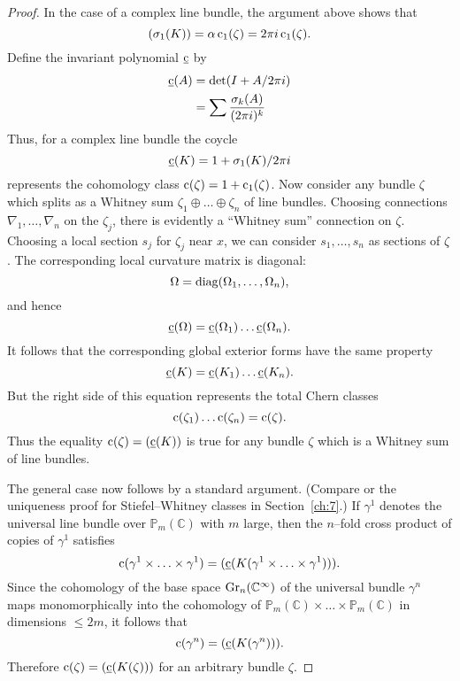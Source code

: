 \documentclass[../main]{subfiles}
\begin{document}
\begin{proof}
In the case of a complex line bundle, the argument above shows that \[(\sigma_1(K)) = \alpha \operatorname{c}_1(\zeta) = 2 \pi i \operatorname{c}_1(\zeta).\] Define the invariant polynomial $\underline {\operatorname{c}}$ by 
\begin{align*}
{\underline {\operatorname{c}}}(A) & = \det(I + A/2\pi i) \\ & = \sum \dfrac{\sigma_k(A)}{(2 \pi i)^k}
\end{align*}
Thus, for a complex line bundle the coycle \[{\underline {\operatorname{c}}}(K) = 1 + \sigma_1(K)/2 \pi i\] represents the cohomology class $\operatorname{c}(\zeta) = 1 + \operatorname{c}_1(\zeta)$. Now consider any bundle $\zeta$ which splits as a Whitney sum $\zeta_1 \oplus \ldots \oplus \zeta_n$ of line bundles. Choosing connections $\nabla_1, \ldots, \nabla_n$ on the $\zeta_j$, there is evidently a ``Whitney sum'' connection on $\zeta$. Choosing a local section $s_j$ for $\zeta_j$ near $x$, we can consider $s_1, \ldots, s_n$ as sections of $\zeta$. The corresponding local curvature matrix is diagonal: \[\Omega = \operatorname{diag}(\Omega_1, \ldots, \Omega_n),\] and hence \[{\underline {\operatorname{c}}}(\Omega) = {\underline {\operatorname{c}}}(\Omega_1) \ldots {\underline {\operatorname{c}}}(\Omega_n).\] It follows that the corresponding global exterior forms have the same property \[{\underline {\operatorname{c}}}(K) = {\underline {\operatorname{c}}}(K_1) \ldots {\underline {\operatorname{c}}}(K_n).\] But the right side of this equation represents the total Chern classes \[\operatorname{c}(\zeta_1) \ldots \operatorname{c}(\zeta_n) = \operatorname{c}(\zeta).\] Thus the equality $\operatorname{c} (\zeta) = ({\underline {\operatorname{c}}}(K))$ is true for any bundle $\zeta$ which is a Whitney sum of line bundles.

The general case now follows by a standard argument. (Compare \cite[Section 4.2]{hirzebruch53} or the uniqueness proof for Stiefel--Whitney classes in Section~\ref{ch:7}.) If $\gamma^1$ denotes the universal line bundle over ${\mathbb P}_m(\mathbb C)$ with $m$ large, then the $n$--fold cross product of copies of $\gamma^1$ satisfies \[\operatorname{c}(\gamma^1 \times \ldots \times \gamma^1) = ({\underline {\operatorname{c}}}(K(\gamma^1 \times \ldots \times \gamma^1))).\] Since the cohomology of the base space $\operatorname{Gr}_n({\mathbb C}^\infty)$ of the universal bundle $\gamma^n$ maps monomorphically into the cohomology of ${\mathbb P}_m(\mathbb C) \times \ldots \times {\mathbb P}_m(\mathbb C)$ in dimensions $\le 2m$, it follows that \[\operatorname{c}(\gamma^n) = ({\underline {\operatorname{c}}}(K(\gamma^n))).\] Therefore $\operatorname{c}(\zeta) = ({\underline {\operatorname{c}}}(K(\zeta)))$ for an arbitrary bundle $\zeta$. 
\end{proof}
\end{document}
